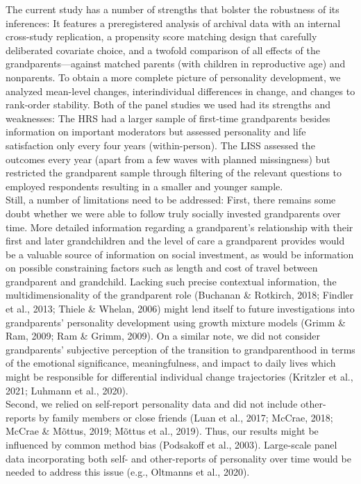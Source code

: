 \documentclass[
  english,
  man, noextraspace]{apa7}
\begin{document}
The current study has a number of strengths that bolster the robustness of its inferences: It features a preregistered analysis of archival data with an internal cross-study replication, a propensity score matching design that carefully deliberated covariate choice, and a twofold comparison of all effects of the grandparents---against matched parents (with children in reproductive age) and nonparents. To obtain a more complete picture of personality development, we analyzed mean-level changes, interindividual differences in change, and changes to rank-order stability. Both of the panel studies we used had its strengths and weaknesses: The HRS had a larger sample of first-time grandparents besides information on important moderators but assessed personality and life satisfaction only every four years (within-person). The LISS assessed the outcomes every year (apart from a few waves with planned missingness) but restricted the grandparent sample through filtering of the relevant questions to employed respondents resulting in a smaller and younger sample.\\
Still, a number of limitations need to be addressed: First, there remains some doubt whether we were able to follow truly socially invested grandparents over time. More detailed information regarding a grandparent's relationship with their first and later grandchildren and the level of care a grandparent provides would be a valuable source of information on social investment, as would be information on possible constraining factors such as length and cost of travel between grandparent and grandchild. Lacking such precise contextual information, the multidimensionality of the grandparent role (Buchanan \& Rotkirch, 2018; Findler et al., 2013; Thiele \& Whelan, 2006) might lend itself to future investigations into grandparents' personality development using growth mixture models (Grimm \& Ram, 2009; Ram \& Grimm, 2009). On a similar note, we did not consider grandparents' subjective perception of the transition to grandparenthood in terms of the emotional significance, meaningfulness, and impact to daily lives which might be responsible for differential individual change trajectories (Kritzler et al., 2021; Luhmann et al., 2020).\\
Second, we relied on self-report personality data and did not include other-reports by family members or close friends (Luan et al., 2017; McCrae, 2018; McCrae \& Mõttus, 2019; Mõttus et al., 2019). Thus, our results might be influenced by common method bias (Podsakoff et al., 2003). Large-scale panel data incorporating both self- and other-reports of personality over time would be needed to address this issue (e.g., Oltmanns et al., 2020).\\
\end{document}
